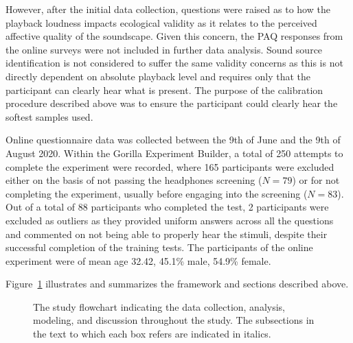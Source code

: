 \documentclass[
  authoryear,
  preprint,
  3p,
  onecolumn]{elsarticle}
\begin{document}
However, after the initial data collection, questions were raised as to
how the playback loudness impacts ecological validity as it relates to
the perceived affective quality of the soundscape. Given this concern,
the PAQ responses from the online surveys were not included in further
data analysis. Sound source identification is not considered to suffer
the same validity concerns as this is not directly dependent on absolute
playback level and requires only that the participant can clearly hear
what is present. The purpose of the calibration procedure described
above was to ensure the participant could clearly hear the softest
samples used.

Online questionnaire data was collected between the 9th of June and the
9th of August 2020. Within the Gorilla Experiment Builder, a total of
250 attempts to complete the experiment were recorded, where 165
participants were excluded either on the basis of not passing the
headphones screening (\(N=79\)) or for not completing the experiment,
usually before engaging into the screening (\(N=83\)). Out of a total of
88 participants who completed the test, 2 participants were excluded as
outliers as they provided uniform answers across all the questions and
commented on not being able to properly hear the stimuli, despite their
successful completion of the training tests. The participants of the
online experiment were of mean age 32.42, 45.1\% male, 54.9\% female.

Figure~\ref{fig-framework} illustrates and summarizes the framework and
sections described above.

\begin{figure}


\caption{\label{fig-framework}The study flowchart indicating the data
collection, analysis, modeling, and discussion throughout the study. The
subsections in the text to which each box refers are indicated in
italics.}

\end{figure}%
\end{document}
